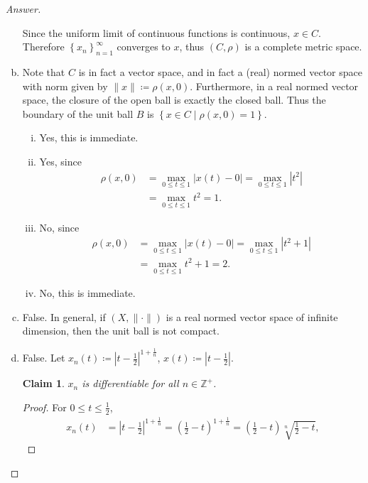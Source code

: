\documentclass[12pt]{article}
\newcommand{\z}{\mathbb{Z}}
\newcommand\paren[1]{\left( #1 \right)}
\newcommand\setb[1]{\left \{ #1 \right \}}
\newtheorem*{claim}{Claim}
\theoremstyle{definition}
\begin{document}
\begin{proof}[Answer]
\begin{enumerate}[(a)]
        Since the uniform limit of continuous functions is continuous, $x \in C$. Therefore $\setb{x_n}_{n=1}^{\infty}$ converges to $x$, thus $(C,\rho)$ is a complete metric space.
        \item Note that $C$ is in fact a vector space, and in fact a (real) normed vector space with norm given by $\|x\| \coloneqq \rho(x,0)$. Furthermore, in a real normed vector space, the closure of the open ball is exactly the closed ball. Thus the boundary of the unit ball $B$ is $\setb{ x \in C \mid \rho(x,0) = 1 }$.
        \begin{enumerate}[(i)]
            \item Yes, this is immediate.
            \item Yes, since 
            \begin{align*}
                \rho(x,0) & = \max\limits_{0 \leq t \leq 1} |x(t) - 0| = \max \limits_{0 \leq t \leq 1} \left| t^2 \right| \\
                & = \max \limits_{0 \leq t \leq 1} t^2 = 1.
            \end{align*}
            \item No, since
            \begin{align*}
                \rho(x,0) & = \max\limits_{0 \leq t \leq 1} |x(t) - 0| = \max \limits_{0 \leq t \leq 1} \left| t^2 + 1 \right| \\
                & = \max \limits_{0 \leq t \leq 1} t^2 + 1 = 2.
            \end{align*}
            \item No, this is immediate.
        \end{enumerate}
        \item False. In general, if $(X,\|\cdot\|)$ is a real normed vector space of infinite dimension, then the unit ball is not compact. 
        \item False. Let $x_n(t) \coloneqq \left| t - \frac{1}{2} \right|^{1 + \frac{1}{n}}$, $x(t) \coloneqq \left| t - \frac{1}{2} \right|$.
        \begin{claim}
            $x_n$ is differentiable for all $n \in \z^+$.
        \end{claim}
        \begin{proof}
            For $0 \leq t \leq \frac{1}{2}$, 
            \begin{align*}
                x_n(t) & = \left| t - \frac{1}{2} \right|^{ 1 + \frac{1}{n} } = \paren{ \frac{1}{2} - t }^{ 1 + \frac{1}{n} } = \paren{ \frac{1}{2} - t } \sqrt[n]{ \frac{1}{2} - t },

\end{align*}
\end{proof}
\end{enumerate}
\end{proof}
\end{document}
